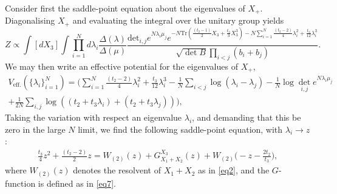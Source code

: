 Consider first the saddle-point equation about the eigenvalues of $X_+$. Diagonalising $X_+$ and
evaluating the integral over the unitary group yields
%
\begin{equation}
    \label{step1}
    Z \propto \int [dX_3] \int \prod_{i=1}^N d\lambda_i \frac{\Delta(\lambda)}{\Delta(\mu)} \frac{\text{det}_{i,j} e^{N \lambda_i \mu_j} e^{-N\text{Tr}\left( \frac{(t_2-1)}{2} X_3 + \frac{t_3}{3} X_3^3\right) -N \sum_{i=1}^N \frac{(t_2-2)}{4}\lambda_i^2 + \frac{t_3}{12} \lambda_i^3}}{\sqrt{\det{B}} \prod_{i<j} (b_i + b_j)}.
\end{equation}
%
We may then write an effective potential for the eigenvalues of $X_+$,
%
\begin{multline}
    V_{\text{eff.}} ( \{ \lambda_i \}_{i=1}^N) =  \bigg(  \sum_{i=1}^N \frac{(t_2-2)}{4} \lambda_i^2 + \frac{t_3}{12} \lambda_i^3  - \frac{1}{N} \sum_{i<j} \log{(\lambda_i - \lambda_j)} - \frac{1}{N}\log{\det_{i,j}{e^{N \lambda_i \mu_j}}} \\
    + \frac{1}{2N} \sum_{i,j} \log{((t_2+t_3\lambda_i)+(t_2 + t_3\lambda_j))} \bigg),
\end{multline}
%
Taking the variation with respect an eigenvalue $\lambda_i$, and demanding that this be zero in the
large $N$ limit, we find the following saddle-point equation, with $\lambda_i\rightarrow z$:
\begin{align}
    \label{2MMsaddle2}
    \frac{t_3}{4}z^2 + \frac{(t_2-2)}{2} z =  W_{(2)}(z) + G_{X_1 + X_2}^{X_3}(z) +  W_{(2)}\big(-z - \frac{2t_2}{t_3}\big),
\end{align}
%
where $W_{(2)}(z)$ denotes the resolvent of $X_1 + X_2$ as in \eqref{eq2}, and the $G$-function is
defined as in \eqref{eq7}.

